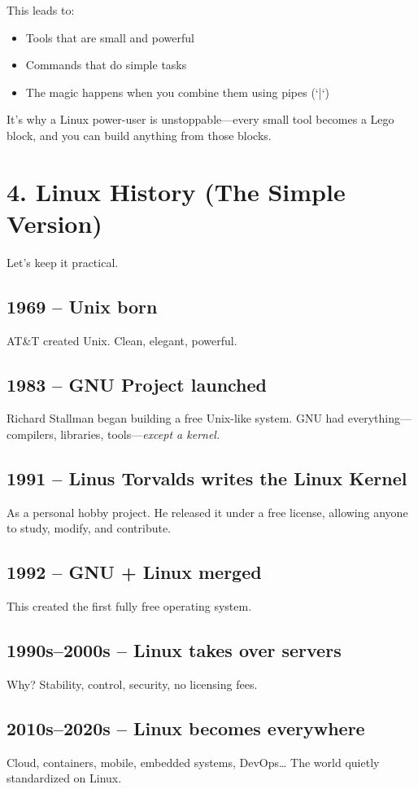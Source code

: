 \documentclass[12pt]{article}
\begin{document}
This leads to:

\begin{itemize}
    \item Tools that are small and powerful
    \item Commands that do simple tasks
    \item The magic happens when you combine them using pipes (`|`)
\end{itemize}

It's why a Linux power-user is unstoppable—every small tool becomes a Lego block, and you can build anything from those blocks.

\section*{4. Linux History (The Simple Version)}

Let's keep it practical.

\subsection*{1969 – Unix born}
AT&T created Unix. Clean, elegant, powerful.

\subsection*{1983 – GNU Project launched}
Richard Stallman began building a free Unix-like system. GNU had everything—compilers, libraries, tools—\textit{except a kernel.}

\subsection*{1991 – Linus Torvalds writes the Linux Kernel}
As a personal hobby project. He released it under a free license, allowing anyone to study, modify, and contribute.

\subsection*{1992 – GNU + Linux merged}
This created the first fully free operating system.

\subsection*{1990s–2000s – Linux takes over servers}
Why? Stability, control, security, no licensing fees.

\subsection*{2010s–2020s – Linux becomes everywhere}
Cloud, containers, mobile, embedded systems, DevOps… The world quietly standardized on Linux.
\end{document}
